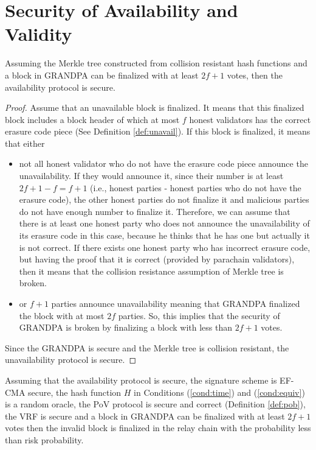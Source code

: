 \section{Security of Availability and Validity}


\begin{theorem}[Availability]
Assuming the Merkle tree constructed from collision resistant hash functions and a block in GRANDPA can be finalized with at least $2f+1$ votes, then the availability protocol is secure.
\end{theorem}

\begin{proof}
Assume that an unavailable block is finalized. It means that this finalized block includes a block header of which at most $f$ honest validators has the correct erasure code piece (See Definition \ref{def:unavail}). If this block is finalized, it means that either
\begin{itemize}
    \item not all honest validator who do not have the erasure code piece announce the unavailability. If they would announce it, since their number is at least $2f+1 - f =f+1$ (i.e., honest parties - honest parties who do not have the erasure code), the other honest parties do not finalize it and malicious parties do not have enough number to finalize it. Therefore, we can assume that there is at least one honest party who does not announce the unavailability of its erasure code in this case, because he thinks that he has one but actually it is not correct. If there exists one honest party who has incorrect erasure code, but having the proof that it is correct (provided by parachain validators), then it means that the collision resistance assumption of Merkle tree is broken. 
    
    \item or  $f+1$ parties announce unavailability meaning that GRANDPA finalized the block with at most $2f$  parties. So, this implies that the security of GRANDPA is broken by finalizing a block with less than $2f+1$ votes.
\end{itemize}

Since the GRANDPA is secure and the Merkle tree is collision resistant, the unavailability protocol is secure.
\end{proof}

\begin{theorem}[Validity]
\label{thm:valid}
Assuming that the availability protocol is secure, the signature scheme is EF-CMA secure, the hash function $H$ in Conditions (\ref{cond:time}) and  (\ref{cond:equiv}) is a random oracle, the PoV protocol is secure and correct (Definition \ref{def:pob}), the VRF is secure and a block in GRANDPA can be finalized with at least $2f+1$ votes then the invalid block is finalized in the relay chain with  the probability less than risk probability.
\end{theorem}

